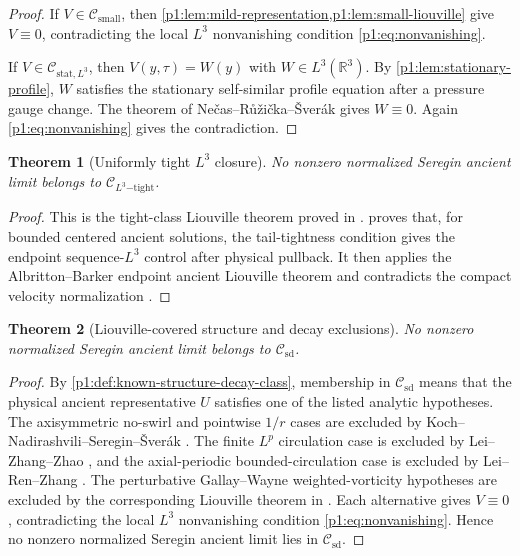 \documentclass[11pt]{amsart}
\theoremstyle{plain}
\newtheorem{theorem}{Theorem}[section]
\theoremstyle{definition}
\theoremstyle{remark}
\numberwithin{equation}{section}
\newcommand{\R}{\mathbb R}
\newcommand{\calC}{\mathcal C}
\begin{document}
\begin{proof}
If \(V\in\calC_{\mathrm{small}}\), then
\cref{p1:lem:mild-representation,p1:lem:small-liouville} give \(V\equiv0\),
contradicting the local \(L^3\) nonvanishing condition
\eqref{p1:eq:nonvanishing}.

If \(V\in\calC_{\mathrm{stat},L^3}\), then
\(V(y,\tau)=W(y)\) with \(W\in L^3(\R^3)\).  By
\cref{p1:lem:stationary-profile}, \(W\) satisfies the stationary self-similar
profile equation after a pressure gauge change.
The theorem of Ne\v{c}as--R\r{u}\v{z}i\v{c}ka--\v{S}ver\'ak
\cite{NRS1996} gives \(W\equiv0\).  Again
\eqref{p1:eq:nonvanishing} gives the contradiction.
\end{proof}

\begin{theorem}[Uniformly tight \(L^3\) closure]
\label{p1:hyp:tight-liouville}
No nonzero normalized Seregin ancient limit belongs to
\(\calC_{L^3\mathrm{-tight}}\).
\end{theorem}

\begin{proof}
This is the tight-class Liouville theorem proved in
.
 proves that, for bounded centered ancient solutions,
the tail-tightness condition gives the endpoint sequence-\(L^3\) control after
physical pullback.  It then applies the Albritton--Barker endpoint ancient
Liouville theorem and contradicts the compact velocity normalization
.
\end{proof}

\begin{theorem}[Liouville-covered structure and decay exclusions]
\label{p1:thm:known-structure-decay-liouville}
No nonzero normalized Seregin ancient limit belongs to
\(\calC_{\mathrm{sd}}\).
\end{theorem}

\begin{proof}
By \cref{p1:def:known-structure-decay-class}, membership in
\(\calC_{\mathrm{sd}}\) means that the physical ancient representative
\(U\) satisfies one of the listed analytic hypotheses.  The axisymmetric
no-swirl and pointwise \(1/r\) cases are excluded by
Koch--Nadirashvili--Seregin--\v{S}ver\'ak \cite{KNSS2009}.  The finite
\(L^p\) circulation case is excluded by Lei--Zhang--Zhao \cite{LZZ2017}, and
the axial-periodic bounded-circulation case is excluded by Lei--Ren--Zhang
\cite{LRZ2022}.  The perturbative Gallay--Wayne weighted-vorticity hypotheses
are excluded by the corresponding Liouville theorem in
.  Each
alternative gives \(V\equiv0\), contradicting the local \(L^3\) nonvanishing
condition \eqref{p1:eq:nonvanishing}.  Hence no nonzero normalized Seregin
ancient limit lies in \(\calC_{\mathrm{sd}}\).
\end{proof}
\end{document}
